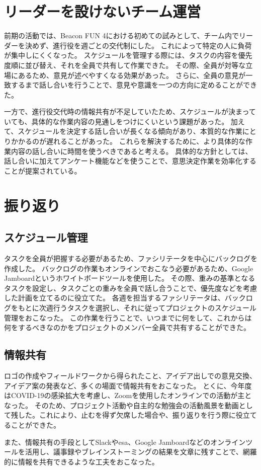 \section{リーダーを設けないチーム運営}
前期の活動では、Beacon FUN 4における初めての試みとして、チーム内でリーダーを決めず、進行役を週ごとの交代制にした。
これによって特定の人に負荷が集中しにくくなった。
スケジュールを管理する際には、タスクの内容を優先度順に並び替え、それを全員で共有して作業できた。
その際、全員が対等な立場にあるため、意見が述べやすくなる効果があった。
さらに、全員の意見が一致するまで話し合いを行うことで、意見や意識を一つの方向に定めることができた。

一方で、進行役交代時の情報共有が不足していたため、スケジュールが決まっていても、具体的な作業内容の見通しをつけにくいという課題があった。
加えて、スケジュールを決定する話し合いが長くなる傾向があり、本質的な作業にとりかかるのが遅れることがあった。
これらを解決するために、より具体的な作業内容の話し合いに時間を使うべきであると考える。
具体的な方針としては、話し合いに加えてアンケート機能などを使うことで、意思決定作業を効率化することが提案されている。

\section{振り返り}
\subsection{スケジュール管理}
タスクを全員が把握する必要があるため、ファシリテータを中心にバックログを作成した。
バックログの作業もオンラインでおこなう必要があるため、Google Jamboardというホワイトボードツールを使用した。
その際、重みの基準となるタスクを設定し、タスクごとの重みを全員で話し合うことで、優先度などを考慮した計画を立てるのに役立てた。
各週を担当するファシリテータは、バックログをもとに次週行うタスクを選択し、それに従ってプロジェクトのスケジュール管理をおこなった。
この作業を行うことで、いつまでに何をして、これからは何をするべきなのかをプロジェクトのメンバー全員で共有することができた。

\subsection{情報共有}
ロゴの作成やフィールドワークから得られたこと、アイデア出しでの意見交換、アイデア案の発表など、多くの場面で情報共有をおこなった。
とくに、今年度はCOVID-19の感染拡大を考慮し、Zoomを使用したオンラインでの活動が主となった。
そのため、プロジェクト活動や自主的な勉強会の活動風景を動画として残した。これにより、止むを得ず欠席した場合や、振り返りを行う際に役立てることができた。

また、情報共有の手段としてSlackやesa、Google Jamboardなどのオンラインツールを活用し、議事録やブレインストーミングの結果を文章に残すことで、網羅的に情報を共有できるような工夫をおこなった。

